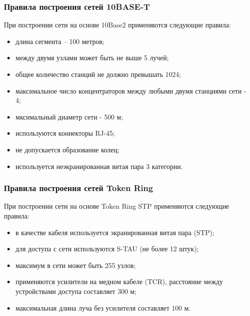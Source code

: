 \subsubsection{Правила построения сетей 10BASE-T}

При построении сети на основе 10Base2 применяются следующие правила:
\begin{itemize}
\item длина сегмента – 100 метров;
\item между двумя узлами может быть не выше 5 лучей; 
\item общее количество станций не должно превышать 1024;
\item максимальное число концентраторов между любыми двумя станциями сети - 4;
\item мксимальный диаметр сети - 500 м;
\item используются коннекторы RJ-45;
\item не допускается образование колец;
\item используется неэкранированная витая пара 3 категории.
\end{itemize}

\subsubsection{Правила построения сетей Token Ring}

При построении сети на основе Token Ring STP применяются следующие правила:
\begin{itemize}
\item в качестве кабеля используется экранированная витая пара (STP);
\item для доступа с сети используются S-TAU (не более 12 штук);
\item максимум в сети может быть 255 узлов;
\item применяются усилители на медном кабеле (TCR), расстояние между устройствами доступа составляет 300 м;
\item максимальная длина луча без усилителя составляет 100 м.
\end{itemize}
